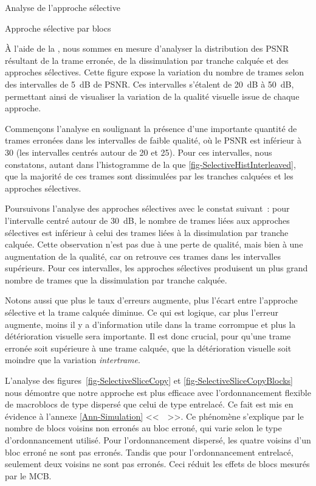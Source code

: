 \begin{section}{Analyse de l'approche sélective}
\begin{subsection}{Approche sélective par blocs}
\FloatBarrier
\end{subsection}

À l'aide de la , nous sommes en mesure d'analyser la
distribution des PSNR résultant de la trame erronée, de la dissimulation par
tranche calquée et des approches sélectives. Cette figure expose la variation du
nombre de trames selon des intervalles de 5~dB de PSNR. Ces intervalles
s'étalent de 20~dB à 50~dB, permettant ainsi de visualiser la variation de la
qualité visuelle issue de chaque approche.

Commençons l'analyse en soulignant la présence d'une importante quantité de
trames erronées dans les intervalles de faible qualité, où le PSNR est inférieur
à 30 (les intervalles centrés autour de 20 et 25). Pour ces intervalles, nous
constatons, autant dans l'histogramme de la  que
\ref{fig-SelectiveHistInterleaved}, que la majorité de ces trames sont
dissimulées par les tranches calquées et les approches sélectives.

Poursuivons l'analyse des approches sélectives avec le constat suivant~: pour
l'intervalle centré autour de 30~dB, le nombre de trames liées aux approches
sélectives est inférieur à celui des trames liées à la dissimulation par tranche
calquée. Cette observation n'est pas due à une perte de qualité, mais bien à une
augmentation de la qualité, car on retrouve ces trames dans les intervalles
supérieurs. Pour ces intervalles, les approches sélectives produisent un plus
grand nombre de trames que la dissimulation par tranche calquée.

Notons aussi que plus le taux d'erreurs augmente, plus l'écart entre l'approche
sélective et la trame calquée diminue. Ce qui est logique, car plus l'erreur
augmente, moins il y a d'information utile dans la trame corrompue et plus la
détérioration visuelle sera importante. Il est donc crucial, pour qu'une trame
erronée soit supérieure à une trame calquée, que la détérioration visuelle soit
moindre que la variation \textit{intertrame}.

L'analyse des figures~\ref{fig-SelectiveSliceCopy} et
\ref{fig-SelectiveSliceCopyBlocks} nous démontre que notre approche est plus
efficace avec l'ordonnancement flexible de macroblocs de type dispersé que celui
de type entrelacé. Ce fait est mis en évidence à l'annexe \ref{Ann-Simulation}
<<~~>>. Ce phénomène s'explique par le nombre de blocs
voisins non erronés au bloc erroné, qui varie selon le type d'ordonnancement
utilisé. Pour l'ordonnancement dispersé, les quatre voisins d'un bloc erroné ne
sont pas erronés. Tandis que pour l'ordonnancement entrelacé, seulement deux
voisins ne sont pas erronés. Ceci réduit les effets de blocs mesurés par le MCB.


\end{section}
